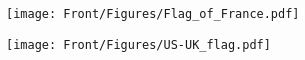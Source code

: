 \pagestyle{empty}
\cleardoublepage\mbox{}
\clearpage

\setlength{\evensidemargin}{59pt}
\setlength{\hsize}{\paperwidth}
\addtolength{\hsize}{-\evensidemargin}
\addtolength{\hsize}{-\evensidemargin}
\addtolength{\hsize}{-2in}

\begin{center}
    \texttt{[image: Front/Figures/Flag\_of\_France.pdf]}
\end{center}



\vfill

\begin{center}
    \texttt{[image: Front/Figures/US-UK\_flag.pdf]}
\end{center}

\itshape

